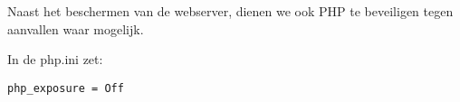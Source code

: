 Naast het beschermen van de webserver, dienen we ook PHP te beveiligen tegen aanvallen waar mogelijk.

In de php.ini zet:
\begin{lstlisting}
php_exposure = Off
\end{lstlisting}
